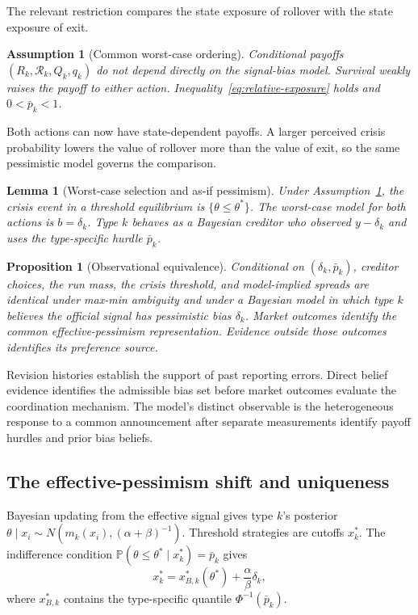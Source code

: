 \documentclass[11pt]{article}
\newtheorem{proposition}{Proposition}
\newtheorem{lemma}{Lemma}
\newtheorem{assumption}{Assumption}
\theoremstyle{definition}
\newcommand{\Prob}{\mathbb{P}}
\begin{document}
The relevant restriction compares the state exposure of rollover with the state exposure of exit.

\begin{assumption}[Common worst-case ordering]\label{ass:exit}
Conditional payoffs $(R_k,\mathcal R_k,Q_k,q_k)$ do not depend directly on the signal-bias model. Survival weakly raises the payoff to either action. Inequality~\eqref{eq:relative-exposure} holds and $0<\bar p_k<1$.
\end{assumption}

Both actions can now have state-dependent payoffs. A larger perceived crisis probability lowers the value of rollover more than the value of exit, so the same pessimistic model governs the comparison.

\begin{lemma}[Worst-case selection and as-if pessimism]\label{lem:asif}
Under Assumption~\ref{ass:exit}, the crisis event in a threshold equilibrium is $\{\theta\leq\theta^*\}$. The worst-case model for both actions is $b=\delta_k$. Type $k$ behaves as a Bayesian creditor who observed $y-\delta_k$ and uses the type-specific hurdle $\bar p_k$.
\end{lemma}

\begin{proposition}[Observational equivalence]\label{prop:equivalence}
Conditional on $(\delta_k,\bar p_k)$, creditor choices, the run mass, the crisis threshold, and model-implied spreads are identical under max-min ambiguity and under a Bayesian model in which type $k$ believes the official signal has pessimistic bias $\delta_k$. Market outcomes identify the common effective-pessimism representation. Evidence outside those outcomes identifies its preference source.
\end{proposition}

Revision histories establish the support of past reporting errors. Direct belief evidence identifies the admissible bias set before market outcomes evaluate the coordination mechanism. The model's distinct observable is the heterogeneous response to a common announcement after separate measurements identify payoff hurdles and prior bias beliefs.

\subsection{The effective-pessimism shift and uniqueness}

Bayesian updating from the effective signal gives type $k$'s posterior $\theta\mid x_i\sim N(m_k(x_i),(\alpha+\beta)^{-1})$. Threshold strategies are cutoffs $x_k^*$. The indifference condition $\Prob(\theta\leq\theta^*\mid x_k^*)=\bar p_k$ gives
\begin{equation}
x_k^*=x_{B,k}^*(\theta^*)+\frac{\alpha}{\beta}\delta_k,
\label{eq:cutoff}
\end{equation}
where $x_{B,k}^*$ contains the type-specific quantile $\Phi^{-1}(\bar p_k)$.
\end{document}
